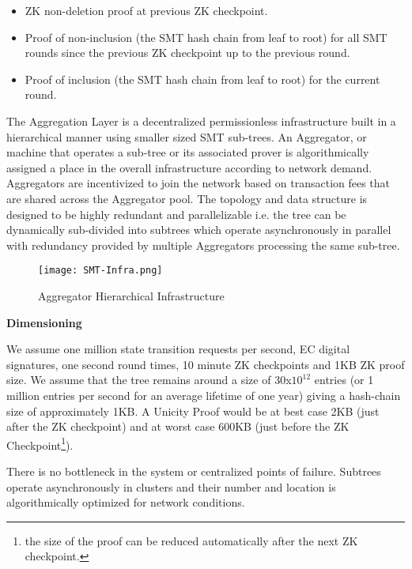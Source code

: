 \documentclass{article}
\begin{document}
 \begin{itemize}
\setlength{\leftmargin}{1em}
\item ZK non-deletion proof at previous ZK checkpoint.
\item Proof of non-inclusion (the SMT hash chain from leaf to root) for all SMT rounds since the previous ZK checkpoint up to the previous round.
\item Proof of inclusion (the SMT hash chain from leaf to root) for the current round.
\end{itemize}


The Aggregation Layer is a decentralized permissionless infrastructure built in a hierarchical manner using smaller sized SMT sub-trees. An Aggregator, or machine that operates a sub-tree or its associated prover is algorithmically assigned a place in the overall infrastructure according to network demand. Aggregators are incentivized to join the network based on transaction fees that are shared across the Aggregator pool. The topology and data structure is designed to be highly redundant and parallelizable i.e. the tree can be dynamically sub-divided into subtrees which operate asynchronously in parallel with redundancy provided by multiple Aggregators processing the same sub-tree.  


\begin{figure}[htbp]
    \centering
    \texttt{[image: SMT-Infra.png]}
    \caption{Aggregator Hierarchical Infrastructure}
    \label{fig:SMT-Infra}
\end{figure}

\textbf{Dimensioning}
\vspace{2mm}

We assume one million state transition requests per second, EC digital signatures, one second round times, 10 minute ZK checkpoints and 1KB ZK proof size. We assume that the tree remains around a size of 30x$10^{12}$ entries (or 1 million entries per second for an average lifetime of one year) giving a hash-chain size of approximately 1KB.
A Unicity Proof would be at best case 2KB (just after the ZK checkpoint) and at worst case 600KB (just before the ZK Checkpoint\footnote{the size of the proof can be reduced automatically after the next ZK checkpoint.}). 

\vspace{2mm}

There is no bottleneck in the system or centralized points of failure. Subtrees operate asynchronously in clusters and their number and location is algorithmically optimized for network conditions.
\end{document}

